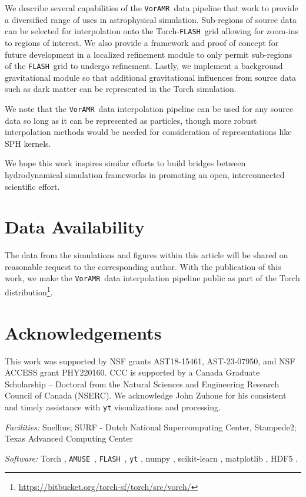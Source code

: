 \documentclass[twoside]{drexel-thesis}
\newcommand\voramr{\texttt{VorAMR}}
\newcommand\flash{\texttt{FLASH}}
\newcommand\amuse{\texttt{AMUSE}}
\begin{document}
\begin{thesis}
We describe several capabilities of the \voramr~data pipeline that work to provide a diversified range of uses in astrophysical simulation. Sub-regions of source data can be selected for interpolation onto the Torch-\flash~grid allowing for zoom-ins to regions of interest. We also provide a framework and proof of concept for future development in a localized refinement module to only permit sub-regions of the \flash~grid to undergo refinement. Lastly, we implement a background gravitational module so that additional gravitational influences from source data such as dark matter can be represented in the Torch simulation.

We note that the \voramr~data interpolation pipeline can be used for any source data so long as it can be represented as particles, though more robust interpolation methods would be needed for consideration of representations like SPH kernels.

We hope this work inspires similar efforts to build bridges between hydrodynamical simulation frameworks in promoting an open, interconnected scientific effort.

\section*{Data Availability}
The data from the simulations and figures within this article will be shared on reasonable request to the corresponding author. With the publication of this work, we make the \voramr~data interpolation pipeline public as part of the Torch distribution\footnote{\url{https://bitbucket.org/torch-sf/torch/src/vorch/}}.

\section{Acknowledgements}
This work was supported by NSF grants AST18-15461, AST-23-07950, and NSF ACCESS grant PHY220160. CCC is supported by a Canada Graduate Scholarship -- Doctoral from the Natural Sciences and Engineering Research Council of Canada (NSERC). We acknowledge John Zuhone for his consistent and timely assistance with \texttt{yt} visualizations and processing.

\emph{Facilities:} Snellius; SURF - Dutch National Supercomputing Center, Stampede2; Texas Advanced Computing Center

\emph{Software:} Torch \citep{wall_collisional_2019,wall_modeling_2020}, \amuse~\citep{portegies_zwart_multiphysics_2009,portegies_zwart_multi-physics_2013,pelupessy_astrophysical_2013,portegies_zwart_astrophysical_2018}, \flash~\citep{fryxell_flash_2000}, \texttt{yt} \citep{turk_yt_2011}, numpy \citep{oliphant_python_2007}, scikit-learn \citep{pedregosa_f_scikit-learn_2011}, matplotlib \citep{hunter_matplotlib_2007}, HDF5 \citep{koranne_hierarchical_2011}.



\end{thesis}
\end{document}
